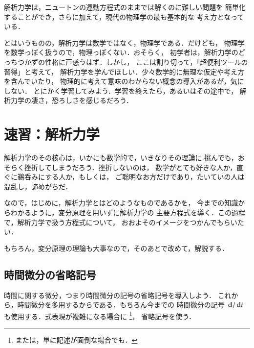             解析力学は，ニュートンの運動方程式のままでは解くのに難しい問題を
            簡単化することができ，さらに加えて，現代の物理学の最も基本的な
            考え方となっている．

            とはいうものの，解析力学は数学ではなく，物理学である．だけども，
            物理学を数学っぽく扱うので，物理っぽくない．おそらく，
            初学者は，解析力学のどっちつかずの性格に戸惑うはず．しかし，
            ここは割り切って，「超便利ツールの習得」と考えて，
            解析力学を学んでほしい．少々数学的に無理な仮定や考え方を含んでいたり，
            物理的に考えて意味のわからない概念の導入があるが，気にしない．
            とにかく学習してみよう．学習を終えたら，あるいはその途中で，
            解析力学の凄さ，恐ろしさを感じるだろう．


    \section{速習：解析力学}\label{sec:sokushu_kaisekirikigaku}
        \begin{mycomment}
            解析力学のその核心は，いかにも数学的で，いきなりその理論に
            挑んでも，おそらく挫折してしまうだろう．挫折しないのは，
            数学がとても好きな人か，直ぐに鵜呑みにする人か，もしくは，
            ご聡明なお方だけであり，たいていの人は混乱し，諦めがちだ．

            なので，はじめに，解析力学とはどのようなものであるかを，
            今までの知識からわかるように，変分原理を用いずに解析力学の
            主要方程式を導く．この過程で，解析力学で扱う方程式について，
            おおよそのイメージをつかんでもらいたい．

            もちろん，変分原理の理論も大事なので，そのあとで改めて，解説する．
        \end{mycomment}
        \subsection{時間微分の省略記号}
            時間に関する微分，つまり時間微分の記号の省略記号を導入しよう．
            これから，時間微分を多用するからである．もちろん今までの
            時間微分の記号 $\,\mathrm{d}/\,\mathrm{d} t$ も使用する．式表現が複雑になる場合に
                \footnote{
                    または，単に記述が面倒な場合でも．
                }，
            省略記号を使う．


